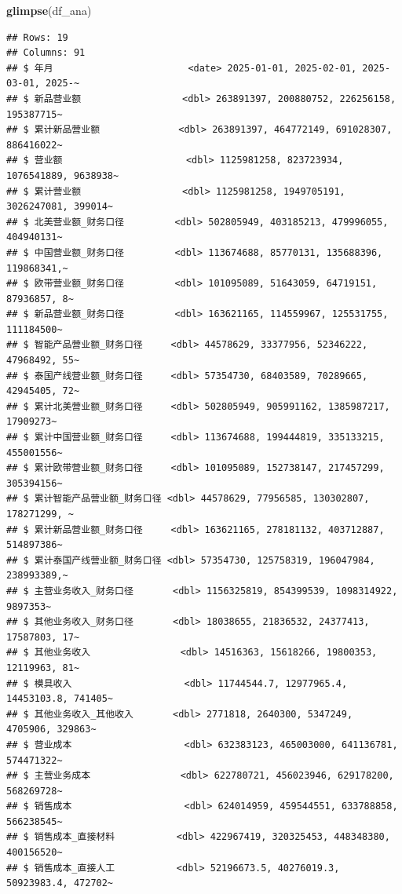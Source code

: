 \documentclass[
]{article}
\newenvironment{Shaded}{\begin{snugshade}}{\end{snugshade}}
\newcommand{\FunctionTok}[1]{\textcolor[rgb]{0.13,0.29,0.53}{\textbf{#1}}}
\newcommand{\NormalTok}[1]{#1}
\begin{document}
\begin{Shaded}
\begin{Highlighting}[]
\FunctionTok{glimpse}\NormalTok{(df\_ana)}
\end{Highlighting}
\end{Shaded}

\begin{verbatim}
## Rows: 19
## Columns: 91
## $ 年月                        <date> 2025-01-01, 2025-02-01, 2025-03-01, 2025-~
## $ 新品营业额                  <dbl> 263891397, 200880752, 226256158, 195387715~
## $ 累计新品营业额              <dbl> 263891397, 464772149, 691028307, 886416022~
## $ 营业额                      <dbl> 1125981258, 823723934, 1076541889, 9638938~
## $ 累计营业额                  <dbl> 1125981258, 1949705191, 3026247081, 399014~
## $ 北美营业额_财务口径         <dbl> 502805949, 403185213, 479996055, 404940131~
## $ 中国营业额_财务口径         <dbl> 113674688, 85770131, 135688396, 119868341,~
## $ 欧带营业额_财务口径         <dbl> 101095089, 51643059, 64719151, 87936857, 8~
## $ 新品营业额_财务口径         <dbl> 163621165, 114559967, 125531755, 111184500~
## $ 智能产品营业额_财务口径     <dbl> 44578629, 33377956, 52346222, 47968492, 55~
## $ 泰国产线营业额_财务口径     <dbl> 57354730, 68403589, 70289665, 42945405, 72~
## $ 累计北美营业额_财务口径     <dbl> 502805949, 905991162, 1385987217, 17909273~
## $ 累计中国营业额_财务口径     <dbl> 113674688, 199444819, 335133215, 455001556~
## $ 累计欧带营业额_财务口径     <dbl> 101095089, 152738147, 217457299, 305394156~
## $ 累计智能产品营业额_财务口径 <dbl> 44578629, 77956585, 130302807, 178271299, ~
## $ 累计新品营业额_财务口径     <dbl> 163621165, 278181132, 403712887, 514897386~
## $ 累计泰国产线营业额_财务口径 <dbl> 57354730, 125758319, 196047984, 238993389,~
## $ 主营业务收入_财务口径       <dbl> 1156325819, 854399539, 1098314922, 9897353~
## $ 其他业务收入_财务口径       <dbl> 18038655, 21836532, 24377413, 17587803, 17~
## $ 其他业务收入                <dbl> 14516363, 15618266, 19800353, 12119963, 81~
## $ 模具收入                    <dbl> 11744544.7, 12977965.4, 14453103.8, 741405~
## $ 其他业务收入_其他收入       <dbl> 2771818, 2640300, 5347249, 4705906, 329863~
## $ 营业成本                    <dbl> 632383123, 465003000, 641136781, 574471322~
## $ 主营业务成本                <dbl> 622780721, 456023946, 629178200, 568269728~
## $ 销售成本                    <dbl> 624014959, 459544551, 633788858, 566238545~
## $ 销售成本_直接材料           <dbl> 422967419, 320325453, 448348380, 400156520~
## $ 销售成本_直接人工           <dbl> 52196673.5, 40276019.3, 50923983.4, 472702~

\end{verbatim}
\end{document}
